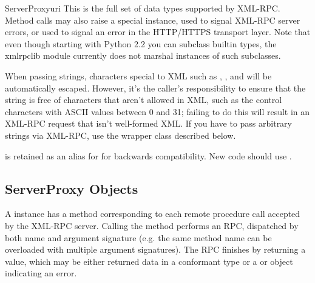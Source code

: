 \begin{classdesc}{ServerProxy}{uri}
This is the full set of data types supported by XML-RPC.  Method calls
may also raise a special  instance, used to signal
XML-RPC server errors, or  used to signal an
error in the HTTP/HTTPS transport layer.  Note that even though starting
with Python 2.2 you can subclass builtin types, the xmlrpclib module
currently does not marshal instances of such subclasses.

When passing strings, characters special to XML such as \samp{<},
\samp{>}, and \samp{\&} will be automatically escaped.  However, it's
the caller's responsibility to ensure that the string is free of
characters that aren't allowed in XML, such as the control characters
with ASCII values between 0 and 31; failing to do this will result in
an XML-RPC request that isn't well-formed XML.  If you have to pass
arbitrary strings via XML-RPC, use the  wrapper class
described below.

 is retained as an alias for  for backwards
compatibility.  New code should use .

\end{classdesc}


\begin{seealso}
\end{seealso}


\subsection{ServerProxy Objects \label{serverproxy-objects}}

A  instance has a method corresponding to
each remote procedure call accepted by the XML-RPC server.  Calling
the method performs an RPC, dispatched by both name and argument
signature (e.g. the same method name can be overloaded with multiple
argument signatures).  The RPC finishes by returning a value, which
may be either returned data in a conformant type or a  or
 object indicating an error.

